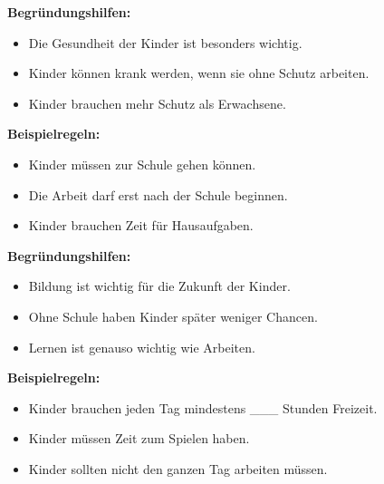 \documentclass[12pt, a4paper]{article}
\newenvironment{cardbox}[1]{%
    \begin{framed}
        \noindent\colorbox{boxcolor}{\makebox[\dimexpr\linewidth-2\fboxsep\relax][c]{\textbf{\textcolor{white}{#1}}}}
        \par\vspace{0.5em}
    }{%
    \end{framed}
}
\newenvironment{hintbox}{%
    \begin{framed}
        \setlength{\fboxsep}{10pt}
        \color{black}
        \itshape
    }{%
    \end{framed}
}
\begin{document}
\begin{multicols}{2}
\begin{cardbox}{BEREICH: GESUNDHEIT}
            \textbf{Begründungshilfen:}
            \begin{hintbox}
            \begin{itemize}[leftmargin=*]
                \item Die Gesundheit der Kinder ist besonders wichtig.
                \item Kinder können krank werden, wenn sie ohne Schutz arbeiten.
                \item Kinder brauchen mehr Schutz als Erwachsene.
            \end{itemize}
            \end{hintbox}
        \end{cardbox}

        \begin{cardbox}{BEREICH: BILDUNG}
            \textbf{Beispielregeln:}
            \begin{itemize}[leftmargin=*]
                \item Kinder müssen zur Schule gehen können.
                \item Die Arbeit darf erst nach der Schule beginnen.
                \item Kinder brauchen Zeit für Hausaufgaben.
            \end{itemize}
            
            \textbf{Begründungshilfen:}
            \begin{hintbox}
            \begin{itemize}[leftmargin=*]
                \item Bildung ist wichtig für die Zukunft der Kinder.
                \item Ohne Schule haben Kinder später weniger Chancen.
                \item Lernen ist genauso wichtig wie Arbeiten.
            \end{itemize}
            \end{hintbox}
        \end{cardbox}

        \begin{cardbox}{BEREICH: FREIZEIT}
            \textbf{Beispielregeln:}
            \begin{itemize}[leftmargin=*]
                \item Kinder brauchen jeden Tag mindestens \_\_\_ Stunden Freizeit.
                \item Kinder müssen Zeit zum Spielen haben.
                \item Kinder sollten nicht den ganzen Tag arbeiten müssen.
            \end{itemize}
            

\end{cardbox}
\end{multicols}
\end{document}
